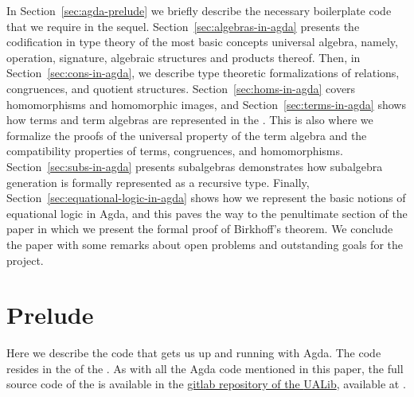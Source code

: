 \documentclass[a4paper,USenglish,cleveref,autoref,thm-restate]{lipics-v2019}
\begin{document}
In Section~\ref{sec:agda-prelude} we briefly describe the necessary boilerplate code that we require in the sequel.
Section~\ref{sec:algebras-in-agda} presents the codification in type theory of the most basic concepts universal algebra, namely, operation, signature, algebraic structures and products thereof. Then, in Section~\ref{sec:cons-in-agda}, we describe type theoretic formalizations of relations, congruences, and quotient structures. Section~\ref{sec:homs-in-agda} covers homomorphisms and homomorphic images, and Section~\ref{sec:terms-in-agda} shows how terms and term algebras are represented in the \agdaualib. This is also where we formalize the proofs of the universal property of the term algebra and the compatibility properties of terms, congruences, and homomorphisms. Section~\ref{sec:subs-in-agda} presents subalgebras demonstrates how subalgebra generation is formally represented as a recursive type.
Finally, Section~\ref{sec:equational-logic-in-agda} shows how we represent the basic notions of equational logic in Agda, and this paves the way to the penultimate section of the paper in which we present the formal proof of Birkhoff's theorem.  We conclude the paper with some remarks about open problems and outstanding goals for the project.

\section{Prelude}\label{sec:prelude}
Here we describe the code that gets us up and running with Agda.  The code resides in the \preludemodule of the \agdaualib. As with all the Agda code mentioned in this paper, the full source code of the \preludemodule is available in the \href{https://gitlab.com/ualib/ualib.gitlab.io}{gitlab repository of the \textsf{UALib}}, available at \ualibgitlabio.
\end{document}
